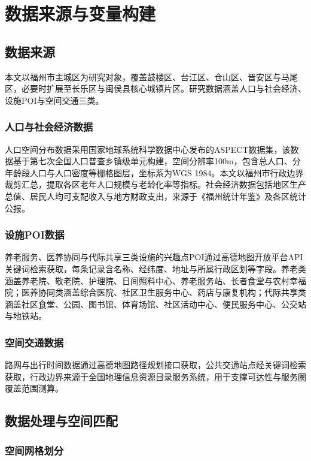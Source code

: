 \section{数据来源与变量构建}

\subsection{数据来源}

本文以福州市主城区为研究对象，覆盖鼓楼区、台江区、仓山区、晋安区与马尾区，必要时扩展至长乐区与闽侯县核心城镇片区。研究数据涵盖人口与社会经济、设施POI与空间交通三类。

\subsubsection{人口与社会经济数据}

人口空间分布数据采用国家地球系统科学数据中心发布的ASPECT数据集，该数据基于第七次全国人口普查乡镇级单元构建，空间分辨率100m，包含总人口、分年龄段人口与人口密度等栅格图层，坐标系为WGS 1984。本文以福州市行政边界裁剪汇总，提取各区老年人口规模与老龄化率等指标。社会经济数据包括地区生产总值、居民人均可支配收入与地方财政支出，来源于《福州统计年鉴》及各区统计公报。

\subsubsection{设施POI数据}

养老服务、医养协同与代际共享三类设施的兴趣点POI通过高德地图开放平台API关键词检索获取，每条记录含名称、经纬度、地址与所属行政区划等字段。养老类涵盖养老院、敬老院、护理院、日间照料中心、养老服务站、长者食堂与农村幸福院；医养协同类涵盖综合医院、社区卫生服务中心、药店与康复机构；代际共享类涵盖社区食堂、公园、图书馆、体育场馆、社区活动中心、便民服务中心、公交站与地铁站。

\subsubsection{空间交通数据}

路网与出行时间数据通过高德地图路径规划接口获取，公共交通站点经关键词检索获取，行政边界来源于全国地理信息资源目录服务系统，用于支撑可达性与服务圈覆盖范围测算。

\subsection{数据处理与空间匹配}

\subsubsection{空间网格划分}

